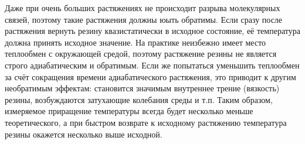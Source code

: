 Даже при очень больших растяжениях не происходит разрыва молекулярных связей,
поэтому такие растяжения должны юыть обратимы. Если сразу после растяжения вернуть
резину квазистатически в исходное состояние, её температура должна принять исходное значение.
На практике неизбежно имеет место теплообмен с окружающей средой, поэтому
растяжение резины не является строго адиабатическим и обратимым. Если же
попытаться уменьшить теплообмен за счёт сокращения времени адиабатического растяжения,
это приводит к другим необратимым эффектам: становится
значимым внутреннее трение (вязкость) резины, возбуждаются затухающие
колебания среды и т.п. Таким образом, измеряемое приращение температуры
всегда будет несколько меньше теоретического, а при быстром возврате к исходному
растяжению температура резины окажется несколько выше исходной.
